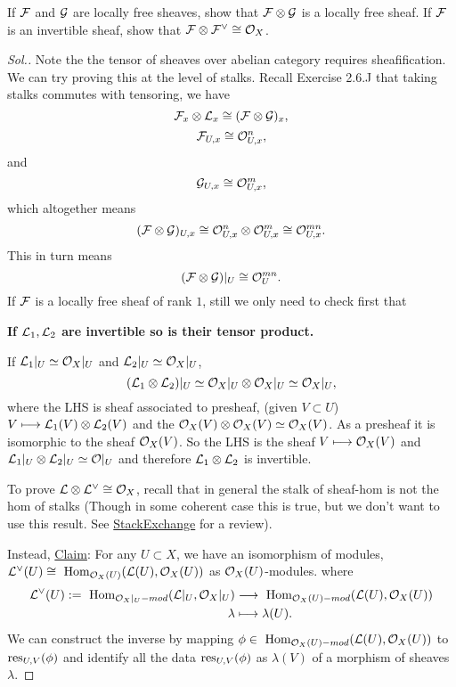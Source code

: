 \documentclass[11pt]{book} %
\begin{document}
\begin{exr}\label{chap13exr:tensor_product_of_invertible_sheaves}
If ${\cal F}$ and ${\cal G}$ are locally free sheaves, show that ${\cal F}\otimes {\cal G}$ is a locally free sheaf.  If ${\cal F}$ is an invertible sheaf, show that ${\cal F}\otimes {\cal F}^\vee\cong {\cal O}_X$.
\end{exr}
\begin{proof}[Sol.]
Note the the tensor of sheaves over abelian category requires sheafification. We can try proving this at the level of stalks. Recall Exercise 2.6.J that taking stalks commutes with tensoring, we have
$$
{\cal F}_{x}\otimes{\cal L}_{x}\cong ({\cal F}\otimes {\cal G})_{x},
$$
$$
{\cal F}_{U,x}\cong{\cal O}_{U,x}^n,
$$
and
$$
{\cal G}_{U,x}\cong {\cal O}_{U,x}^m,
$$
which altogether means 
$$
({\cal F}\otimes {\cal G})_{U,x}\cong {\cal O}_{U,x}^n\otimes {\cal O}_{U,x}^m\cong {\cal O}_{U,x}^{mn}.
$$
This in turn means
$$
({\cal F}\otimes {\cal G})|_U\cong {\cal O}_{U}^{mn} .
$$
If ${\cal F}$ is a locally free sheaf of rank $1$, still we only need to check first that

\textbf{If ${\cal L}_1,{\cal L}_2$ are invertible so is their tensor product.} 

If ${\cal L}_1|_U\simeq {\cal O}_X|_U$ and ${\cal L}_2|_U\simeq {\cal O}_X|_U$,  
$$
({\cal L}_1\otimes{\cal L}_2)|_U\simeq {\cal O}_X|_U\otimes{\cal O}_X|_U\simeq {\cal O}_X|_U,
$$ where the LHS is sheaf associated to presheaf, (given $V\subset U$) $V\longmapsto{\cal L}_1(V)\otimes{\cal L}_2(V)$ and the ${\cal O}_X(V)\otimes {\cal O}_X(V)\simeq {\cal O}_X(V)$. As a presheaf it is isomorphic to the sheaf ${\cal O}_{X}(V)$. So the LHS is the sheaf $V\longmapsto {\cal O}_X(V)$ and ${\cal L}_1|_U\otimes {\cal L}_2|_U\simeq {\cal O}|_U$ and therefore ${\cal L}_1\otimes {\cal L}_2$ is invertible.

To prove ${\cal L}\otimes {\cal L}^\vee\cong {\cal O}_X$, recall that in general the stalk of sheaf-hom is not the hom of stalks (Though in some coherent case this is true, but we don't want to use this result. See \href{https://mathoverflow.net/questions/642/stalks-of-sheaf-hom}{StackExchange} for a review).

Instead,
\underline{Claim}: For any $U\subset X$, we have an isomorphism of modules, ${\cal L}^\vee(U)\cong \text{ Hom}_{{\cal O}_X(U)}({\cal L}(U),{\cal O}_X(U))$ as ${\cal O}_X(U)$-modules.
where 
$$
\begin{aligned}
{\cal L}^\vee(U):=\text{ Hom}_{{\cal O}_X|_U-mod}({\cal L}|_U,{\cal O}_X|_U)&\longrightarrow \text{ Hom}_{{\cal O}_X(U)-mod}({\cal L}(U),{\cal O}_X(U))\\
\lambda&\longmapsto \lambda(U).
\end{aligned}
$$
We can construct the inverse by mapping $\phi\in \text{ Hom}_{{\cal O}_X(U)-mod}({\cal L}(U),{\cal O}_X(U))$ to $\text{res}_{U,V}(\phi)$ and identify all the data $\text{res}_{U,V}(\phi)$ as $\lambda(V)$ of a morphism of sheaves $\lambda$.


\end{proof}
\end{document}
